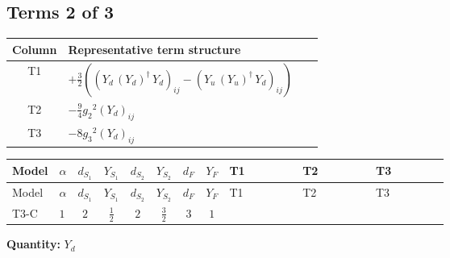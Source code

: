 \documentclass[8pt]{article}
\begin{document}
\begin{landscape}
\subsection*{Terms 2 of 3}
\begin{center}
\begin{tabular}{@{}c >{\raggedright\arraybackslash}p{0.82\linewidth}@{}}
\toprule
Column & Representative term structure \\
\midrule
T1 & \(\displaystyle +\frac{3}{2} (\left({Y_d}\,\left({Y_d}\right)^{\dagger}\,{Y_d}\right)_{ij}-\left({Y_u}\,\left({Y_u}\right)^{\dagger}\,{Y_d}\right)_{ij})\) \\
\midrule
T2 & \(\displaystyle -\frac{9}{4} {g_2}^2 \left({Y_d}\right)_{ij}\) \\
\midrule
T3 & \(\displaystyle -8 {g_3}^2 \left({Y_d}\right)_{ij}\) \\
\midrule
\bottomrule
\end{tabular}
\end{center}
\smallskip
\tiny
\begin{longtable}{@{}llcccccc >{\raggedright\arraybackslash}p{0.21\linewidth} >{\raggedright\arraybackslash}p{0.21\linewidth} >{\raggedright\arraybackslash}p{0.21\linewidth}@{}}
\toprule
Model & $\alpha$ & $d_{S_1}$ & $Y_{S_1}$ & $d_{S_2}$ & $Y_{S_2}$ & $d_F$ & $Y_F$ & T1 & T2 & T3 \\
\midrule
\endfirsthead
\toprule
Model & $\alpha$ & $d_{S_1}$ & $Y_{S_1}$ & $d_{S_2}$ & $Y_{S_2}$ & $d_F$ & $Y_F$ & T1 & T2 & T3 \\
\midrule
\endhead
T3-C & $1$ & $2$ & $\frac{1}{2}$ & $2$ & $\frac{3}{2}$ & $3$ & $1$ & \scriptsize\adjustbox{max width=\linewidth}{$\begin{gathered} +\frac{3}{2} (\left({Y_d}\,\left({Y_d}\right)^{\dagger}\,{Y_d}\right)_{ij}-\left({Y_u}\,\left({Y_u}\right)^{\dagger}\,{Y_d}\right)_{ij})\end{gathered}$} & \scriptsize\adjustbox{max width=\linewidth}{$\begin{gathered} -\frac{9}{4} {g_2}^2 \left({Y_d}\right)_{ij}\end{gathered}$} & \scriptsize\adjustbox{max width=\linewidth}{$\begin{gathered} -8 {g_3}^2 \left({Y_d}\right)_{ij}\end{gathered}$} \\
\midrule
\bottomrule
\end{longtable}
\clearpage
\noindent\textbf{Quantity: }$Y_d$\par\smallskip

\end{landscape}
\end{document}
